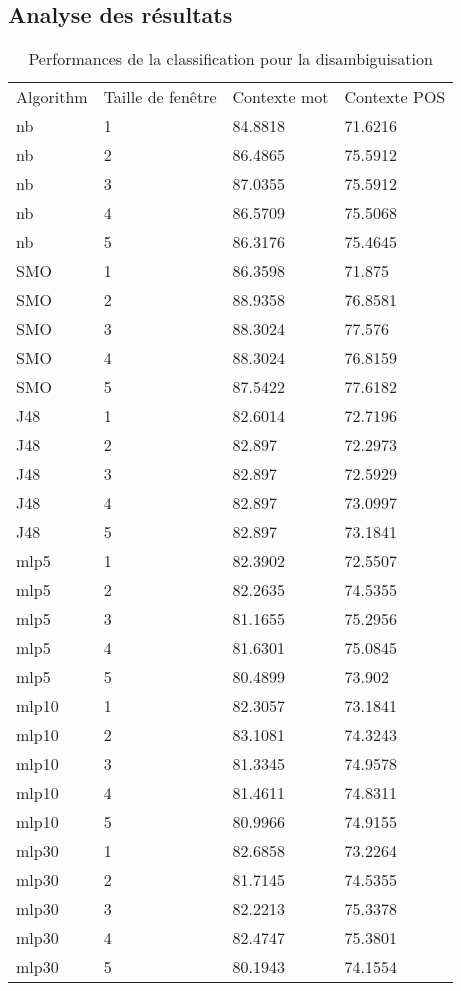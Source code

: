 \documentclass[11pt]{article} %
\begin{document}
\subsection{ Analyse des résultats }
\begin{table}[]
\centering
\caption{Performances de la classification pour la disambiguisation}
\label{table-disambiguation}
\begin{tabular}{llll}
Algorithm  & Taille de fenêtre & Contexte mot    & Contexte POS     \\
nb    & 1    & 84.8818 & 71.6216 \\
nb    & 2    & 86.4865 & 75.5912 \\
nb    & 3    & 87.0355 & 75.5912 \\
nb    & 4    & 86.5709 & 75.5068 \\
nb    & 5    & 86.3176 & 75.4645 \\
SMO   & 1    & 86.3598 & 71.875  \\
SMO   & 2    & 88.9358 & 76.8581 \\
SMO   & 3    & 88.3024 & 77.576  \\
SMO   & 4    & 88.3024 & 76.8159 \\
SMO   & 5    & 87.5422 & 77.6182 \\
J48   & 1    & 82.6014 & 72.7196 \\
J48   & 2    & 82.897  & 72.2973 \\
J48   & 3    & 82.897  & 72.5929 \\
J48   & 4    & 82.897  & 73.0997 \\
J48   & 5    & 82.897  & 73.1841 \\
mlp5  & 1    & 82.3902 & 72.5507 \\
mlp5  & 2    & 82.2635 & 74.5355 \\
mlp5  & 3    & 81.1655 & 75.2956 \\
mlp5  & 4    & 81.6301 & 75.0845 \\
mlp5  & 5    & 80.4899 & 73.902  \\
mlp10 & 1    & 82.3057 & 73.1841 \\
mlp10 & 2    & 83.1081 & 74.3243 \\
mlp10 & 3    & 81.3345 & 74.9578 \\
mlp10 & 4    & 81.4611 & 74.8311 \\
mlp10 & 5    & 80.9966 & 74.9155 \\
mlp30 & 1    & 82.6858 & 73.2264 \\
mlp30 & 2    & 81.7145 & 74.5355 \\
mlp30 & 3    & 82.2213 & 75.3378 \\
mlp30 & 4    & 82.4747 & 75.3801 \\
mlp30 & 5    & 80.1943 & 74.1554
\end{tabular}
\end{table}
\end{document}
